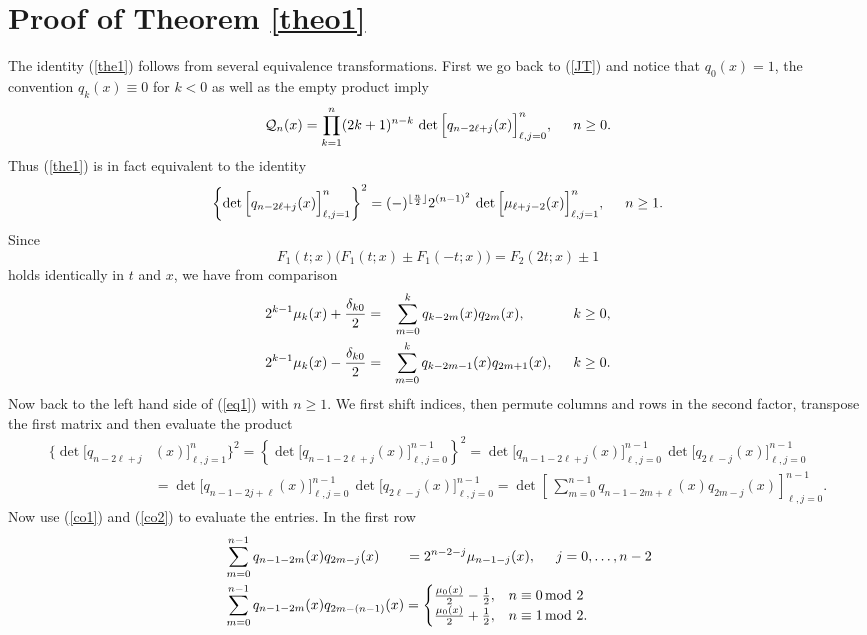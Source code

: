 \documentclass[10pt,oneside,reqno]{amsart}
\numberwithin{equation}{section}
\def\be{\begin{equation}}
\def\ee{\end{equation}}
\def\mod{\, \mathrm{mod}\,\,}
\def\bea{\begin{eqnarray}}
\def\eea{\end{eqnarray}}
\def\eqref#1{(\ref{#1})}
\begin{document}
\section{Proof of Theorem \ref{theo1}}\label{sec1}
The identity \eqref{the1} follows from several equivalence transformations. First we go back to \eqref{JT} and notice that $q_0(x)=1$, the convention $q_k(x)\equiv 0$ for $k<0$ as well as the empty product imply
\begin{equation*}
  \mathcal{Q}_n(x) = \prod_{k=1}^n(2k+1)^{n-k}\,\det\Big[q_{n-2\ell+j}(x)\Big]_{\ell,j=0}^n,\hspace{0.5cm}n\geq 0.
\end{equation*}
Thus \eqref{the1} is in fact equivalent to the identity
\be\label{eq1}
  \left\{\det\Big[q_{n-2\ell+j}(x)\Big]_{\ell,j=1}^n\right\}^2 =(-)^{\lfloor{\frac{n}{2}\rfloor}}2^{(n-1)^2}\,\det\Big[\mu_{\ell+j-2}(x)\Big]_{\ell,j=1}^n,\hspace{0.5cm}n\geq 1.
\ee
Since
\begin{equation*}
  F_1(t;x)\big(F_1(t;x)\pm F_1(-t;x)\big)=F_2(2t;x)\pm 1
\end{equation*}
holds identically in $t$ and $x$, we have from comparison
\bea
  2^{k-1}\mu_k(x)+\frac{\delta_{k0}}{2} &=& \sum_{m=0}^kq_{k-2m}(x)q_{2m}(x),\hspace{1.2cm}k\geq 0,\label{co1}\\
  2^{k-1}\mu_k(x)-\frac{\delta_{k0}}{2} &=& \sum_{m=0}^kq_{k-2m-1}(x)q_{2m+1}(x),\hspace{0.5cm}k\geq 0.\label{co2}
\eea
Now back to the left hand side of \eqref{eq1} with $n\geq 1$. We first shift indices, then permute columns and rows in the second factor, transpose the first matrix and then evaluate
the product
\begin{align*}
  \bigg\{\det\Big[q_{n-2\ell+j}&(x)\Big]_{\ell,j=1}^n\bigg\}^2 = \left\{\det\Big[q_{n-1-2\ell+j}(x)\Big]_{\ell,j=0}^{n-1}\right\}^2=
  \det\Big[q_{n-1-2\ell+j}(x)\Big]_{\ell,j=0}^{n-1}\,\det\Big[q_{2\ell-j}(x)\Big]_{\ell,j=0}^{n-1}\\
&=\det\Big[q_{n-1-2j+\ell}(x)\Big]_{\ell,j=0}^{n-1}\,\det\Big[q_{2\ell-j}(x)\Big]_{\ell,j=0}^{n-1}=
  \det\left[\,\sum_{m=0}^{n-1}q_{n-1-2m+\ell}(x)q_{2m-j}(x)\right]_{\ell,j=0}^{n-1}.
\end{align*}
Now use \eqref{co1} and \eqref{co2} to evaluate the entries. In the first row
\begin{align*}
  &\sum_{m=0}^{n-1}q_{n-1-2m}(x)q_{2m-j}(x) \hspace{0.65cm}= 2^{n-2-j}\mu_{n-1-j}(x),\hspace{0.5cm}j=0,\ldots,n-2\\
&\sum_{m=0}^{n-1}q_{n-1-2m}(x)q_{2m-(n-1)}(x) = \begin{cases}
               \frac{\mu_0(x)}{2}-\frac{1}{2}, &n\equiv 0\mod 2\\
	\frac{\mu_0(x)}{2}+\frac{1}{2},&n\equiv 1\mod 2.
              \end{cases}
\end{align*}
\end{document}
